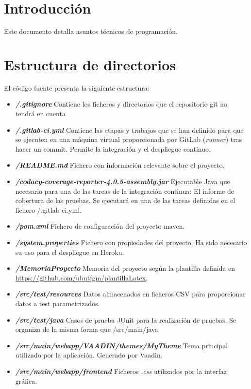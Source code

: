 
\section{Introducción}
Este documento detalla asuntos técnicos de programación.
\section{Estructura de directorios}
El código fuente presenta la siguiente estructura:
\begin{itemize}
	\item \textbf{\textit{/.gitignore}} Contiene los ficheros y directorios que el repositorio git no tendrá en cuenta
	\item \textbf{\textit{/.gitlab-ci.yml}} Contiene las etapas y trabajos que se han definido para que se ejecuten en una máquina virtual proporcionada por GitLab (\textit{runner}) tras hacer un commit. Permite la integración y el despliegue continuo.
	\item \textbf{\textit{/README.md}} Fichero con información relevante sobre el proyecto.
	\item \textbf{\textit{/codacy-coverage-reporter-4.0.5-assembly.jar}} Ejecutable Java que necesario para una de las tareas de la integración continua: El informe de cobertura de las pruebas. Se ejecutará en una de las tareas definidas en el fichero /.gitlab-ci.yml.
	\item \textbf{\textit{/pom.xml}} Fichero de configuración del proyecto maven.
	\item \textbf{\textit{/system.properties}} Fichero con propiedades del proyecto. Ha sido necesario su uso para el despliegue en Heroku.
	\item \textbf{\textit{/MemoriaProyecto}} Memoria del proyecto según la plantilla definida en \url{https://github.com/ubutfgm/plantillaLatex}.
	\item \textbf{\textit{/src/test/resources}} Datos almacenados en ficheros CSV para proporcionar datos a test parametrizados.
	\item \textbf{\textit{/src/test/java}} Casos de prueba JUnit para la realización de pruebas. Se organiza de la misma forma que /src/main/java
	\item \textbf{\textit{/src/main/webapp/VAADIN/themes/MyTheme}} Tema principal utilizado por la aplicación. Generado por Vaadin.
	\item \textbf{\textit{/src/main/webapp/frontend}} Ficheros \textit{.css} utilizados por la interfaz gráfica.

\end{itemize}
